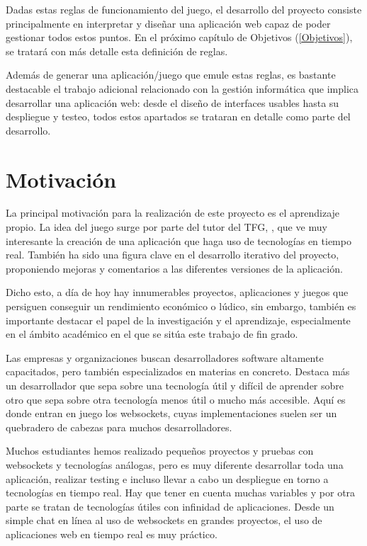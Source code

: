 Dadas estas reglas de funcionamiento del juego, el desarrollo del proyecto consiste principalmente en
interpretar y diseñar una aplicación web capaz de poder gestionar todos estos puntos. En el próximo capítulo de Objetivos (\ref{Objetivos}),
se tratará con más detalle esta definición de reglas.

Además de generar una aplicación/juego que emule estas reglas, es bastante destacable el trabajo adicional relacionado con la gestión informática que
implica desarrollar una aplicación web: desde el diseño de interfaces usables hasta su despliegue y testeo, todos estos apartados se trataran en detalle
como parte del desarrollo.

\section{Motivación}

La principal motivación para la realización de este proyecto es el aprendizaje propio. La idea del juego
surge por parte del tutor del TFG, \nombretutor, que ve muy interesante la creación de una aplicación que haga uso de tecnologías en
tiempo real. También ha sido una figura clave en el desarrollo iterativo del proyecto, proponiendo mejoras y comentarios
a las diferentes versiones de la aplicación.

Dicho esto, a día de hoy hay innumerables proyectos, aplicaciones y juegos que persiguen conseguir un rendimiento económico o lúdico, sin embargo, también es importante destacar el papel
de la investigación y el aprendizaje, especialmente en el ámbito académico en el que se sitúa este trabajo de fin grado.

Las empresas y organizaciones buscan desarrolladores software altamente capacitados, pero también especializados en materias en concreto.
Destaca más un desarrollador que sepa sobre una tecnología útil y difícil de aprender sobre otro que sepa
sobre otra tecnología menos útil o mucho más accesible. Aquí es donde entran en juego los websockets, cuyas implementaciones suelen ser un quebradero
de cabezas para muchos desarrolladores.

Muchos estudiantes hemos realizado pequeños proyectos y pruebas con websockets y tecnologías análogas, pero es muy diferente desarrollar toda una aplicación, realizar testing e
incluso llevar a cabo un despliegue en torno a tecnologías en tiempo real. Hay que tener en cuenta muchas variables y por otra parte se tratan de tecnologías útiles
con infinidad de aplicaciones. Desde un simple chat en línea al uso de websockets en grandes proyectos, el uso de aplicaciones web en tiempo real es muy práctico.

